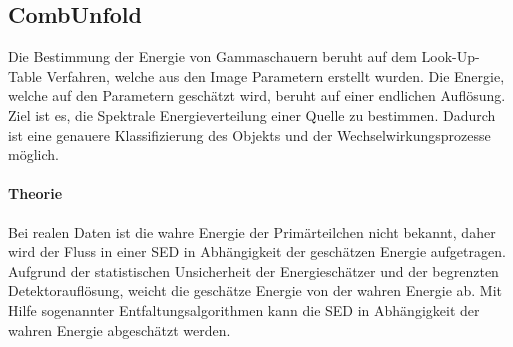 \subsection{CombUnfold}%
\label{sub:combunfold}
Die Bestimmung der Energie von Gammaschauern beruht auf dem Look-Up-Table
Verfahren,
welche aus den Image Parametern erstellt wurden.
Die Energie, welche auf den Parametern geschätzt wird, beruht auf einer
endlichen Auflösung.
Ziel ist es, die Spektrale Energieverteilung einer Quelle zu bestimmen.
Dadurch ist eine genauere Klassifizierung des Objekts und der
Wechselwirkungsprozesse möglich.

\paragraph{Theorie}%


Bei realen Daten ist die wahre Energie der Primärteilchen nicht bekannt,
daher wird der Fluss in einer SED in Abhängigkeit der geschätzen Energie aufgetragen. 
Aufgrund der statistischen Unsicherheit der Energieschätzer 
und der begrenzten Detektorauflösung, 
weicht die geschätze Energie von der wahren Energie ab. 
Mit Hilfe sogenannter Entfaltungsalgorithmen kann die SED in Abhängigkeit der wahren Energie abgeschätzt werden.




